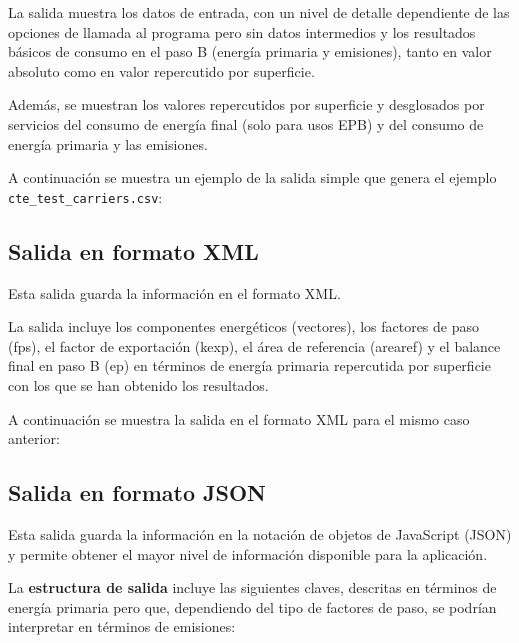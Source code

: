 \documentclass[10pt,notitlepage,oneside,a4paper]{article}
\begin{document}
La salida muestra los datos de entrada, con un nivel de detalle dependiente de las opciones de llamada al programa pero sin datos intermedios y los resultados básicos de consumo en el paso B (energía primaria y emisiones), tanto en valor absoluto como en valor repercutido por superficie.

Además, se muestran los valores repercutidos por superficie y desglosados por servicios del consumo de energía final (solo para usos EPB) y del consumo de energía primaria y las emisiones.

A continuación se muestra un ejemplo de la salida simple que genera el ejemplo \texttt{cte\_test\_carriers.csv}:



\newpage
\subsection{Salida en formato XML}
\label{subsec:formatoxml}

Esta salida guarda la información en el formato XML.

La salida incluye los componentes energéticos (vectores), los factores de paso (fps), el factor de exportación (kexp), el área de referencia (arearef) y el balance final en paso B (ep) en términos de energía primaria repercutida por superficie  con los que se han obtenido los resultados.

A continuación se muestra la salida en el formato XML para el mismo caso anterior:



\newpage
\subsection{Salida en formato JSON}
\label{subsec:formatojson}

Esta salida guarda la información en la notación de objetos de JavaScript (JSON) y permite obtener el mayor nivel de información disponible para la aplicación.

La \textbf{estructura de salida} incluye las siguientes claves, descritas en términos de energía primaria pero que, dependiendo del tipo de factores de paso, se podrían interpretar en términos de emisiones:
\end{document}
